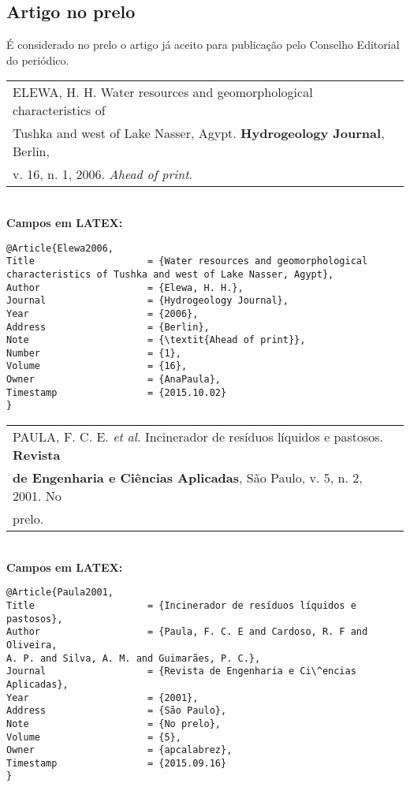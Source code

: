 \subsection{Artigo no prelo}

É considerado no prelo o artigo j\'a aceito para publicação pelo Conselho
Editorial do periódico.

\begin{tabular}{|l|c|} \hline
	ELEWA, H. H. Water resources and geomorphological characteristics of
	\\Tushka and west of Lake Nasser, Agypt. \textbf{Hydrogeology Journal}, Berlin,
	\\v. 16, n. 1, 2006. \textit{Ahead of print}. \\\hline
\end{tabular} \\

\textbf{Campos em LATEX:} 

\begin{verbatim}
@Article{Elewa2006,
Title                    = {Water resources and geomorphological 
characteristics of Tushka and west of Lake Nasser, Agypt},
Author                   = {Elewa, H. H.},
Journal                  = {Hydrogeology Journal},
Year                     = {2006},
Address                  = {Berlin},
Note                     = {\textit{Ahead of print}},
Number                   = {1},
Volume                   = {16},
Owner                    = {AnaPaula},
Timestamp                = {2015.10.02}
}
\end{verbatim}

\begin{tabular}{|l|c|} \hline
	PAULA, F. C. E. \textit{et al.} Incinerador de resíduos líquidos e pastosos.
	\textbf{Revista } \\ \textbf{de Engenharia e Ci\^encias Aplicadas}, São Paulo, v. 5, n. 2,
	2001. No \\prelo. \\\hline
\end{tabular} \\

\textbf{Campos em LATEX:} 

\begin{verbatim}
@Article{Paula2001,
Title                    = {Incinerador de resíduos líquidos e pastosos},
Author                   = {Paula, F. C. E and Cardoso, R. F and Oliveira, 
A. P. and Silva, A. M. and Guimarães, P. C.},
Journal                  = {Revista de Engenharia e Ci\^encias Aplicadas},
Year                     = {2001},
Address                  = {São Paulo},
Note                     = {No prelo},
Volume                   = {5},
Owner                    = {apcalabrez},
Timestamp                = {2015.09.16}
}
\end{verbatim}

